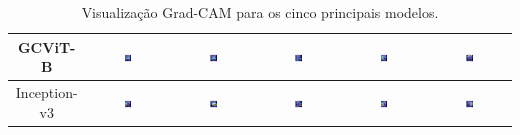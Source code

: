 \begin{table}
\begin{tabular}{|c|c|c|c|c|c|}
        GCViT-B & \includegraphics[width=0.15\textwidth]{figs/gradcams/gradcam_gcvit_kl0.png} & \includegraphics[width=0.15\textwidth]{figs/gradcams/gradcam_gcvit_kl1.png} & \includegraphics[width=0.15\textwidth]{figs/gradcams/gradcam_gcvit_kl2.png} & \includegraphics[width=0.15\textwidth]{figs/gradcams/gradcam_gcvit_kl3.png} & \includegraphics[width=0.15\textwidth]{figs/gradcams/gradcam_gcvit_kl4.png} \\ \hline
        Inception-v3 & \includegraphics[width=0.15\textwidth]{figs/gradcams/gradcam_inceptionv3_kl0.png} & \includegraphics[width=0.15\textwidth]{figs/gradcams/gradcam_inceptionv3_kl1.png} & \includegraphics[width=0.15\textwidth]{figs/gradcams/gradcam_inceptionv3_kl2.png} & \includegraphics[width=0.15\textwidth]{figs/gradcams/gradcam_inceptionv3_kl3.png} & \includegraphics[width=0.15\textwidth]{figs/gradcams/gradcam_inceptionv3_kl4.png} \\ \hline
    \end{tabular}
    \caption{Visualização Grad-CAM para os cinco principais modelos.}
    \label{tab:gradcams_top5_models}
\end{table}